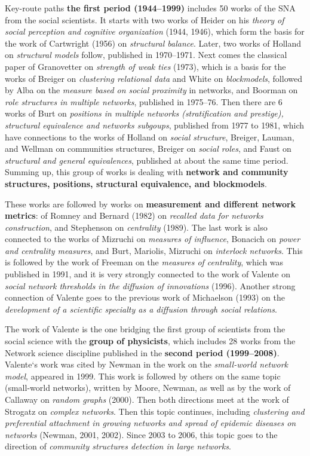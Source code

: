\documentclass[11pt]{article} %
\begin{document}
Key-route paths \textbf{the first period (1944--1999)} includes 50 works of the SNA from the social scientists. It starts with two works of Heider on his \textit{theory of social perception and cognitive organization} (1944, 1946), which form the basis for the work of Cartwright (1956) on \textit{structural balance}. Later, two works of Holland on \textit{structural models} follow, published in 1970--1971. Next comes the classical paper of Granovetter on \textit{strength of weak ties} (1973), which is a basis for the works of Breiger on \textit{clustering relational data} and White on \textit{blockmodels}, followed by Alba on the \textit{measure based on social proximity} in networks, and Boorman on \textit{role structures in multiple networks}, published in 1975--76. Then there are 6 works of Burt on \textit{positions in multiple networks (stratification and prestige), structural equivalence and networks subgoups}, published from 1977 to 1981, which have connections to  the works of Holland on \textit{social structure}, Breiger, Lauman, and Wellman on {communities structures}, Breiger on \textit{social roles}, and Faust on \textit{structural and general equivalences}, published at about the same time period. Summing up, this group of works is dealing with \textbf{network and community structures, positions, structural equivalence, and blockmodels}.  \medskip 

These works are followed by works on \textbf{measurement and different network metrics}: of Romney and Bernard (1982) on \textit{recalled data for networks construction}, and Stephenson on \textit{centrality} (1989). The last work is also connected to the works of Mizruchi on \textit{measures of influence}, Bonacich on \textit{power and centrality measures}, and Burt, Mariolis, Mizruchi on \textit{interlock networks}. This is followed by the work of Freeman on the \textit{measures of centrality}, which was published in 1991, and it is very strongly connected to the work of Valente on \textit{social network thresholds in the diffusion of innovations} (1996). Another strong connection of Valente goes to the previous work of Michaelson (1993) on the \textit{development of a scientific specialty as a diffusion through social relations}.  \medskip 

The work of Valente is the one bridging the first group of scientists from the social science with the \textbf{group of physicists}, which includes 28 works from the Network science discipline published in the \textbf{second period (1999--2008)}. Valente`s work was cited by Newman in the work on the \textit{small-world network model}, appeared in 1999. This work is followed by others on the same topic (small-world networks), written by Moore, Newman, as well as by the work of Callaway on \textit{random graphs} (2000). Then both directions meet at the work of Strogatz on \textit{complex networks}. Then this topic continues, including \textit{clustering and preferential attachment in growing networks and spread of epidemic diseases on networks} (Newman, 2001, 2002). Since 2003 to 2006, this topic goes to the direction of \textit{community structures detection in large networks}. \medskip 
 
\end{document}
